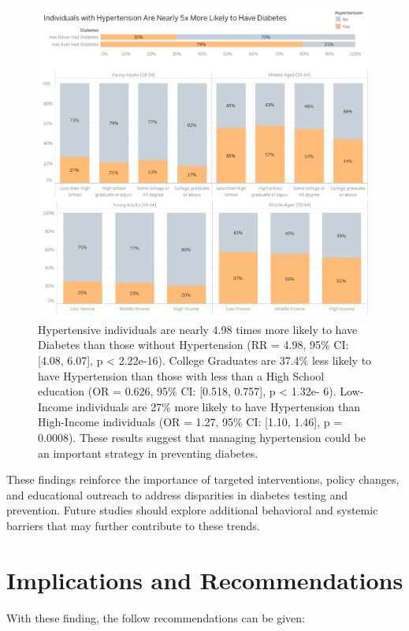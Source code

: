\documentclass[
]{article}
\begin{document}
\begin{figure}[H]

{\centering \includegraphics[width=0.8\linewidth]{../figures/Link Between Hypertension and Diabetes} 

}

\caption{Hypertensive individuals are nearly 4.98 times more likely to have Diabetes than those without Hypertension (RR = 4.98, 95\% CI: [4.08, 6.07], p < 2.22e-16). College Graduates are 37.4\% less likely to have Hypertension than those with less than a High School education (OR = 0.626, 95\% CI: [0.518, 0.757], p < 1.32e- 6). Low-Income individuals are 27\% more likely to have Hypertension than High-Income individuals (OR = 1.27, 95\% CI: [1.10, 1.46], p = 0.0008). These results suggest that managing hypertension could be an important strategy in preventing diabetes.}\label{fig:fig_hypertension_diabetes}
\end{figure}

These findings reinforce the importance of targeted interventions,
policy changes, and educational outreach to address disparities in
diabetes testing and prevention. Future studies should explore
additional behavioral and systemic barriers that may further contribute
to these trends.

\section{Implications and
Recommendations}\label{implications-and-recommendations}

With these finding, the follow recommendations can be given:
\end{document}
